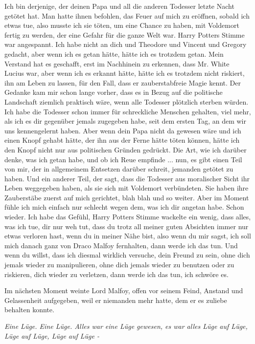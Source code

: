 \glqq{}Ich bin derjenige, der deinen Papa und all die anderen Todesser letzte
Nacht getötet hat. Man hatte ihnen befohlen, das Feuer auf mich zu eröffnen,
sobald ich etwas tue, also musste ich sie töten, um eine Chance zu haben, mit
Voldemort fertig zu werden, der eine Gefahr für die ganze Welt war.\grqq{} Harry
Potters Stimme war angespannt. \glqq{}Ich habe nicht an dich und Theodore und
Vincent und Gregory gedacht, aber wenn ich es getan hätte, hätte ich es trotzdem
getan. Mein Verstand hat es geschafft, erst im Nachhinein zu erkennen, dass Mr.
White Lucius war, aber wenn ich es erkannt hätte, hätte ich es trotzdem nicht
riskiert, ihn am Leben zu lassen, für den Fall, dass er zauberstabfreie Magie
kennt. Der Gedanke kam mir schon lange vorher, dass es in Bezug auf die
politische Landschaft ziemlich praktisch wäre, wenn alle Todesser plötzlich
sterben würden. Ich habe die Todesser schon immer für schreckliche Menschen
gehalten, viel mehr, als ich es dir gegenüber jemals zugegeben habe, seit dem
ersten Tag, an dem wir uns kennengelernt haben. Aber wenn dein Papa nicht da
gewesen wäre und ich einen Knopf gehabt hätte, der ihn aus der Ferne hätte töten
können, hätte ich den Knopf nicht nur aus politischen Gründen gedrückt. Die Art,
wie ich darüber denke, was ich getan habe, und ob ich Reue empfinde ... nun, es
gibt einen Teil von mir, der in allgemeinem Entsetzen darüber schreit, jemanden
getötet zu haben. Und ein anderer Teil, der sagt, dass die Todesser aus
moralischer Sicht ihr Leben weggegeben haben, als sie sich mit Voldemort
verbündeten. Sie haben ihre Zauberstäbe zuerst auf mich gerichtet, blah blah und
so weiter. Aber im Moment fühle ich mich einfach nur schlecht wegen dem, was ich
dir angetan habe. Schon wieder. Ich habe das Gefühl\grqq{}, Harry Potters Stimme
wackelte ein wenig, \glqq{}dass alles, was ich tue, dir nur weh tut, dass du
trotz all meiner guten Absichten immer nur etwas verloren hast, wenn du in
meiner Nähe bist, also wenn du mir sagst, ich soll mich danach ganz von Draco
Malfoy fernhalten, dann werde ich das tun. Und wenn du willst, dass ich diesmal
wirklich versuche, dein Freund zu sein, ohne dich jemals wieder zu manipulieren,
ohne dich jemals wieder zu benutzen oder zu riskieren, dich wieder zu verletzen,
dann werde ich das tun, ich schwöre es.\grqq{}

Im nächsten Moment weinte Lord Malfoy, offen vor seinem Feind, Anstand und
Gelassenheit aufgegeben, weil er niemanden mehr hatte, dem er es zuliebe
behalten konnte.

\emph{Eine Lüge. Eine Lüge. Alles war eine Lüge gewesen, es war alles Lüge auf
Lüge, Lüge auf Lüge, Lüge auf Lüge -}

